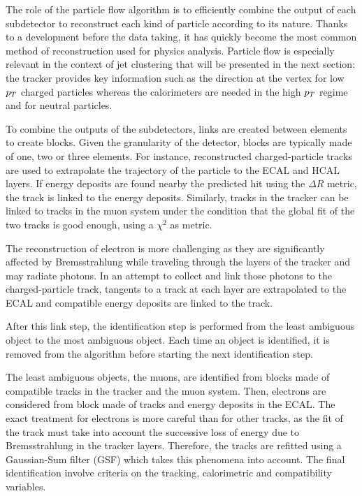    The role of the particle flow algorithm \cite{particleFlow} is to
    efficiently combine the output of each subdetector to reconstruct each kind
    of particle according to its nature. Thanks to a development before the data
    taking, it has quickly become the most common method of reconstruction used
    for physics analysis. Particle flow is especially relevant in the context of
    jet clustering that will be presented in the next section: the tracker
    provides key information such as the direction at the vertex for low $p_T$
    charged particles whereas the calorimeters are needed in the high $p_T$
    regime and for neutral particles.

    To combine the outputs of the subdetectors, links are created between
    elements to create blocks. Given the granularity of the detector, blocks are
    typically made of one, two or three elements. For instance, reconstructed
    charged-particle tracks are used to extrapolate the trajectory of the
    particle to the ECAL and HCAL layers.  If energy deposits are found nearby
    the predicted hit using the $\Delta R$ metric, the track is linked to the
    energy deposits. Similarly, tracks in the tracker can be linked to tracks in
    the muon system under the condition that the global fit of the two tracks is
    good enough, using a $\chi^2$ as metric.

    The reconstruction of electron is more challenging as they are significantly
    affected by Bremsstrahlung while traveling through the layers of the tracker
    and may radiate photons. In an attempt to collect and link those photons to
    the charged-particle track, tangents to a track at each layer are
    extrapolated to the ECAL and compatible energy deposits are linked to the
    track.

    After this link step, the identification step is performed from the least
    ambiguous object to the most ambiguous object. Each time an object is
    identified, it is removed from the algorithm before starting the next
    identification step.

    The least ambiguous objects, the muons, are identified from blocks made of
    compatible tracks in the tracker and the muon system. Then, electrons are
    considered from block made of tracks and energy deposits in the ECAL. The
    exact treatment for electrons is more careful than for other tracks, as the
    fit of the track must take into account the successive loss of energy due to
    Bremsstrahlung in the tracker layers. Therefore, the tracks are refitted
    using a Gaussian-Sum filter (GSF) \cite{GSFelectrons} which takes this
    phenomena into account. The final identification involve criteria on the
    tracking, calorimetric and compatibility variables.

